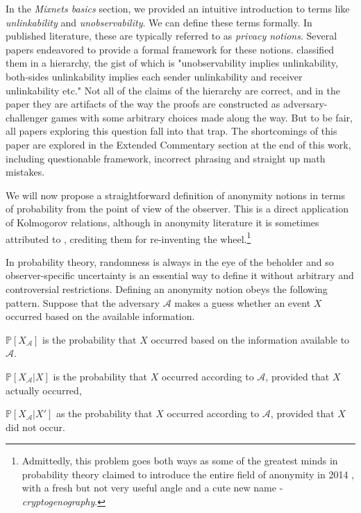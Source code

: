 \documentclass{article}
\begin{document}
In the \textit{Mixnets basics} section, we provided an intuitive introduction to terms like \textit{unlinkability} and \textit{unobservability}. We can define these terms formally. In published literature, these are typically referred to as \textit{privacy notions}. Several papers endeavored to provide a formal framework for these notions.  classified them in a hierarchy, the gist of which is "unobservability implies unlinkability, both-sides unlinkability implies each sender unlinkability and receiver unlinkability etc." Not all of the claims of the hierarchy are correct, and in the paper they are artifacts of the way the proofs are constructed as adversary-challenger games with some arbitrary choices made along the way. But to be fair, all papers exploring this question fall into that trap. The shortcomings of this paper are explored in the Extended Commentary section at the end of this work, including questionable framework, incorrect phrasing and straight up math mistakes. 
\medskip

\noindent We will now propose a straightforward definition of anonymity notions in terms of probability from the point of view of the observer. This is a direct application of Kolmogorov relations, although in anonymity literature it is sometimes attributed to , crediting them for re-inventing the wheel.\footnote{Admittedly, this problem goes both ways as some of the greatest minds in probability theory claimed to introduce the entire field of anonymity in 2014 , with a fresh but not very useful angle and a cute new name - \textit{cryptogenography}.
}\medskip


\noindent  In probability theory, randomness is always in the eye of the beholder and so observer-specific uncertainty is an essential way to define it without arbitrary and controversial restrictions. Defining an anonymity notion obeys the following pattern. Suppose that the adversary $\mathcal{A}$ makes a guess whether an event $X$ occurred based on the available information. 

$\mathbb{P}[X_\mathcal{A}]$ is the probability that $X$ occurred based on the information available to $\mathcal{A}$. 

$\mathbb{P}[X_\mathcal{A}|X]$ is the probability that $X$ occurred according to $\mathcal{A}$, provided that $X$ actually occurred, 

$\mathbb{P}[X_\mathcal{A}|X']$ as the probability that $X$ occurred according to $\mathcal{A}$, provided that $X$ did not occur. 
\end{document}
